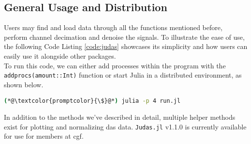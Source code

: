 \clearpage
\subsection{General Usage and Distribution}

Users may find and load data through all the functions mentioned before, perform channel decimation and denoise the signals. To illustrate the ease of use, the following Code Listing \ref{code:judas} showcases its simplicity and how users can easily use it alongside other packages. \\



To run this code, we can either add processes within the program with the \texttt{addprocs(amount::Int)} function or start Julia in a distributed environment, as shown below.

\begin{lstlisting}[style=shellcommand, language=bash, label={code:judasrun}]
(*@\textcolor{promptcolor}{\$}@*) julia -p 4 run.jl
\end{lstlisting}

In addition to the methods we've described in detail, multiple helper methods exist for plotting and normalizing \acrshort{das} data. \texttt{Judas.jl} v1.1.0 is currently available for use for members at \acrshort{cgf}. 

